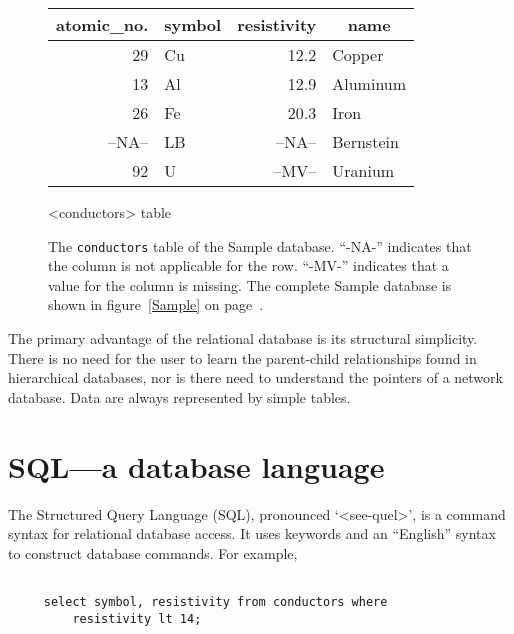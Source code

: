 \documentclass[11pt,a4paper]{report}
\def\I{\index}
\begin{document}
\begin{figure}[htp]
\begin{center}
  \begin{tabular}[t]{|r|l|r|l|}
     \hline
     \multicolumn{1}{|c|}{atomic\_no.}&
     \multicolumn{1}{|c|}{symbol}&
     \multicolumn{1}{|c|}{resistivity}&
     \multicolumn{1}{|c|}{name}\\
     \hline
    29& Cu& 12.2  & Copper\\
    13& Al& 12.9  & Aluminum\\
    26& Fe& 20.3  & Iron\\
--NA--& LB&--NA--& Bernstein\\
    92& U &--MV--  & Uranium\\
     \hline
  \end{tabular}
    \par  {<conductors> table }
  \end{center}
\smallskip
\caption[{\tt conductors} table of the Sample database]
    {The {\tt conductors} table of the Sample database.
    ``-NA-'' indicates that the column is not applicable for
    the row.
    ``-MV-'' indicates that a value for the column is missing.
    The complete Sample database is shown in figure~\ref{Sample}
    on page~\pageref{Sample}.}
   \label{Sample-conductor}
\end{figure}
 
 
The primary advantage of the relational database is its
structural simplicity.  There is no need for the user to
learn the parent-child relationships found in hierarchical
databases, nor is there need to understand the pointers
of a network database.
Data are always represented by simple tables.
 
 
 
 
 
 
 
\section{SQL---a database language}
\I{SQL}
The Structured Query Language (SQL), pronounced `<see-quel\/>',
is a command syntax for relational
database access.  It uses keywords and an ``English'' syntax
to construct database commands.  For example,
 
\begin{verbatim}
 
     select symbol, resistivity from conductors where
         resistivity lt 14;
 
\end{verbatim}
 
\end{document}
